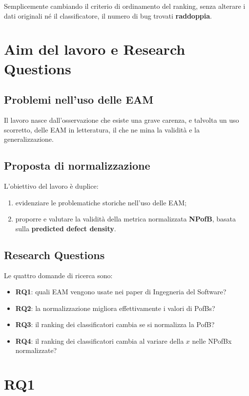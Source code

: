 Semplicemente cambiando il criterio di ordinamento del ranking, senza alterare i dati originali né il classificatore, il numero di bug trovati \textbf{raddoppia}.

\section{Aim del lavoro e Research Questions}

\subsection{Problemi nell'uso delle EAM}

Il lavoro nasce dall'osservazione che esiste una grave carenza, e talvolta un uso scorretto, delle EAM in letteratura, il che ne mina la validità e la generalizzazione.

\subsection{Proposta di normalizzazione}

L'obiettivo del lavoro è duplice:
\begin{enumerate}
    \item evidenziare le problematiche storiche nell'uso delle EAM;
    \item proporre e valutare la validità della metrica normalizzata \textbf{NPofB}, basata sulla \textbf{predicted defect density}.
\end{enumerate}

\subsection{Research Questions}

Le quattro domande di ricerca sono:
\begin{itemize}
    \item \textbf{RQ1}: quali EAM vengono usate nei paper di Ingegneria del Software?
    \item \textbf{RQ2}: la normalizzazione migliora effettivamente i valori di PofBs?
    \item \textbf{RQ3}: il ranking dei classificatori cambia se si normalizza la PofB?
    \item \textbf{RQ4}: il ranking dei classificatori cambia al variare della \(x\) nelle NPofBx normalizzate?
\end{itemize}

\section{RQ1}

